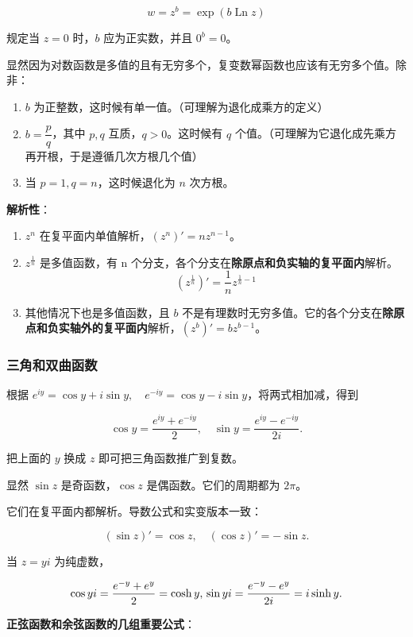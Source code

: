 \[
w=z^b=\exp(b\operatorname{Ln}z)
\]

规定当 \(z=0\) 时，\(b\) 应为正实数，并且 \(0^b=0\)。

显然因为对数函数是多值的且有无穷多个，复变数幂函数也应该有无穷多个值。除非：

\begin{enumerate}
\item \(b\) 为正整数，这时候有单一值。（可理解为退化成乘方的定义）
\item \(b=\dfrac{p}{q}\)，其中 \(p,q\) 互质，\(q>0\)。这时候有 \(q\)
个值。（可理解为它退化成先乘方再开根，于是遵循几次方根几个值）
\item 当 \(p=1,q=n\)，这时候退化为 \(n\) 次方根。
\end{enumerate}

\textbf{解析性}：

\begin{enumerate}
\item \(z^n\) 在复平面内单值解析，\(\left(z^n\right)'=nz^{n-1}\)。
\item \(z^{\frac{1}{n}}\)
是多值函数，有 n 个分支，各个分支在\textbf{除原点和负实轴的复平面内}解析。 \[
    \left(z^{\frac{1}{n}}\right)'=\frac{1}{n}z^{\frac{1}{n}-1}
    \]
\item 其他情况下也是多值函数，且 \(b\)
不是有理数时无穷多值。它的各个分支在\textbf{除原点和负实轴外的复平面内}解析，\(\left(z^b\right)'=bz^{b-1}\)。
\end{enumerate}
\subsubsection{三角和双曲函数}
\label{三角和双曲函数}
根据
\(e^{iy}=\cos y+i\sin y,\quad e^{-iy}=\cos y-i\sin y\)，将两式相加减，得到

\[
\cos y=\frac{e^{iy}+e^{-iy}}{2},\quad \sin y=\frac{e^{iy}-e^{-iy}}{2i}.
\]

把上面的 \(y\) 换成 \(z\) 即可把三角函数推广到复数。

显然 \(\sin z\) 是奇函数，\(\cos z\) 是偶函数。它们的周期都为 \(2\pi\)。

它们在复平面内都解析。导数公式和实变版本一致：

\[
(\sin z)'=\cos z,\quad (\cos z)'=-\sin z.
\]

当 \(z=yi\) 为纯虚数，

\[
\cos yi=\frac{e^{-y}+e^y}{2}=\cosh y,\\
\sin yi=\frac{e^{-y}-e^y}{2i}=i\sinh y.
\]

\textbf{正弦函数和余弦函数的几组重要公式}：

